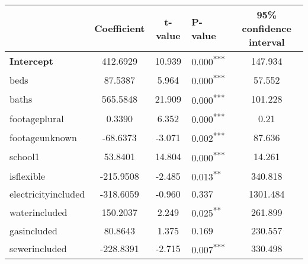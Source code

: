 \documentclass[12pt]{report}
\begin{document}
\begin{table}[ht]
	\centering
	\begin{tabular}{l S[table-format=5.4] S[table-format=4.4] l S[table-format=4.4]}
		\hline\hline
		                                                 & \textbf{Coefficient} & \textbf{t-value} & \textbf{P-value}           & \textbf{95\% confidence interval} \\ \hline
		\textbf{Intercept}                               & 412.6929             & 10.939           & 0.000\textsuperscript{***} & 147.934                           \\
		beds                                             & 87.5387              & 5.964            & 0.000\textsuperscript{***} & 57.552                            \\
		baths                                            & 565.5848             & 21.909           & 0.000\textsuperscript{***} & 101.228                           \\
		footageplural                                    & 0.3390               & 6.352            & 0.000\textsuperscript{***} & 0.21                              \\
		footageunknown                                   & -68.6373             & -3.071           & 0.002\textsuperscript{***} & 87.636                            \\
		school1                                          & 53.8401              & 14.804           & 0.000\textsuperscript{***} & 14.261                            \\
		is\textunderscore flexible                       & -215.9508            & -2.485           & 0.013\textsuperscript{**}  & 340.818                           \\
		electricityincluded                              & -318.6059            & -0.960           & 0.337                      & 1301.484                          \\
		waterincluded                                    & 150.2037             & 2.249            & 0.025\textsuperscript{**}  & 261.899                           \\
		gasincluded                                      & 80.8643              & 1.375            & 0.169                      & 230.557                           \\
		sewerincluded                                    & -228.8391            & -2.715           & 0.007\textsuperscript{***} & 330.498                           \\

\end{tabular}
\end{table}
\end{document}

